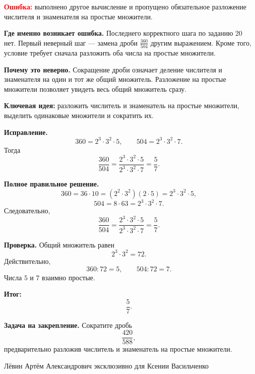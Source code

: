 \documentclass[12pt,a4paper]{article}
\begin{document}
\textcolor{red}{\textbf{Ошибка:}} выполнено другое вычисление и пропущено обязательное разложение числителя и знаменателя на простые множители.

\textbf{Где именно возникает ошибка.}
Последнего корректного шага по заданию 20 нет.
Первый неверный шаг --- замена дроби $\frac{360}{504}$ другим выражением.
Кроме того, условие требует сначала разложить оба числа на простые множители.

\textbf{Почему это неверно.}
Сокращение дроби означает деление числителя и знаменателя на один и тот же общий множитель.
Разложение на простые множители позволяет увидеть весь общий множитель сразу.

\textcolor{blue!60!black}{\textbf{Ключевая идея:}}
разложить числитель и знаменатель на простые множители, выделить одинаковые множители и сократить их.

\textbf{Исправление.}
\[
360=2^3\cdot3^2\cdot5,
\qquad
504=2^3\cdot3^2\cdot7.
\]
Тогда
\[
\frac{360}{504}
=\frac{2^3\cdot3^2\cdot5}{2^3\cdot3^2\cdot7}
=\frac57.
\]

\textbf{Полное правильное решение.}
\[
360=36\cdot10=(2^2\cdot3^2)(2\cdot5)=2^3\cdot3^2\cdot5,
\]
\[
504=8\cdot63=2^3\cdot3^2\cdot7.
\]
Следовательно,
\[
\frac{360}{504}
=\frac{2^3\cdot3^2\cdot5}{2^3\cdot3^2\cdot7}
=\frac57.
\]

\textbf{Проверка.}
Общий множитель равен
\[
2^3\cdot3^2=72.
\]
Действительно,
\[
360:72=5,
\qquad
504:72=7.
\]
Числа $5$ и $7$ взаимно простые.

\textcolor{teal!60!black}{\textbf{Итог:}}
\[
\boxed{\frac57}.
\]

\textbf{Задача на закрепление.}
Сократите дробь
\[
\frac{420}{588},
\]
предварительно разложив числитель и знаменатель на простые множители.


\vfill
\begin{center}
\small Лёвин Артём Александрович эксклюзивно для Ксении Васильченко
\end{center}
\end{document}
